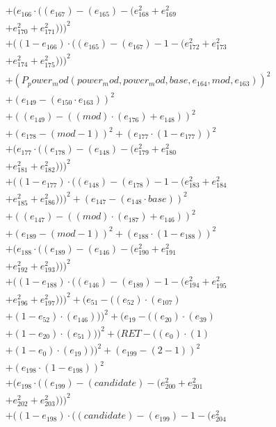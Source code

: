 \documentclass[10pt, a4paper]{article}
\begin{document}
\begin{align*}
& + (e_{166}  \cdot  ((e_{167}) - (e_{165}) - (e_{168}^{2} + e_{169}^{2} \\
& + e_{170}^{2} + e_{171}^{2})))^{2} \\
& + ((1 - e_{166})  \cdot  ((e_{165}) - (e_{167}) - 1 - (e_{172}^{2} + e_{173}^{2} \\
& + e_{174}^{2} + e_{175}^{2})))^{2} \\
& + (P_power_mod(power_mod, power_mod, base, e_{164}, mod, e_{163}))^{2} \\
& + (e_{149} - (e_{150}  \cdot  e_{163}))^{2} \\
& + ((e_{149}) - ((mod)  \cdot  (e_{176}) + e_{148}))^{2} \\
& + (e_{178} - (mod - 1))^{2} + (e_{177}  \cdot  (1 - e_{177}))^{2} \\
& + (e_{177}  \cdot  ((e_{178}) - (e_{148}) - (e_{179}^{2} + e_{180}^{2} \\
& + e_{181}^{2} + e_{182}^{2})))^{2} \\
& + ((1 - e_{177})  \cdot  ((e_{148}) - (e_{178}) - 1 - (e_{183}^{2} + e_{184}^{2} \\
& + e_{185}^{2} + e_{186}^{2})))^{2} + (e_{147} - (e_{148}  \cdot  base))^{2} \\
& + ((e_{147}) - ((mod)  \cdot  (e_{187}) + e_{146}))^{2} \\
& + (e_{189} - (mod - 1))^{2} + (e_{188}  \cdot  (1 - e_{188}))^{2} \\
& + (e_{188}  \cdot  ((e_{189}) - (e_{146}) - (e_{190}^{2} + e_{191}^{2} \\
& + e_{192}^{2} + e_{193}^{2})))^{2} \\
& + ((1 - e_{188})  \cdot  ((e_{146}) - (e_{189}) - 1 - (e_{194}^{2} + e_{195}^{2} \\
& + e_{196}^{2} + e_{197}^{2})))^{2} + (e_{51} - ((e_{52})  \cdot  (e_{107}) \\
& + (1 - e_{52})  \cdot  (e_{146})))^{2} + (e_{19} - ((e_{20})  \cdot  (e_{39}) \\
& + (1 - e_{20})  \cdot  (e_{51})))^{2} + (RET - ((e_{0})  \cdot  (1) \\
& + (1 - e_{0})  \cdot  (e_{19})))^{2} + (e_{199} - (2 - 1))^{2} \\
& + (e_{198}  \cdot  (1 - e_{198}))^{2} \\
& + (e_{198}  \cdot  ((e_{199}) - (candidate) - (e_{200}^{2} + e_{201}^{2} \\
& + e_{202}^{2} + e_{203}^{2})))^{2} \\
& + ((1 - e_{198})  \cdot  ((candidate) - (e_{199}) - 1 - (e_{204}^{2} \\

\end{align*}
\end{document}

